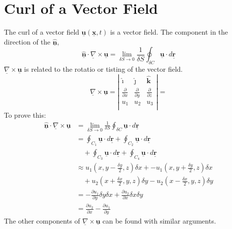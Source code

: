 \documentclass{article}
\renewcommand{\vec}[1]{\underline{\textbf{#1}}}
\newcommand{\veci}{\bm{\hat{\imath}}}
\newcommand{\vecj}{\bm{\hat{\jmath}}}
\newcommand{\veck}{\bm{\hat{k}}}
\newcommand{\vecn}{\underline{\mathbf{\hat{n}}}}
\newcommand{\de}{\delta}
\newcommand{\nab}{\underline{\nabla}}
\newcommand{\pd}[2]{\frac{\partial #1}{\partial #2}}
\newcommand{\curl}{\nab \times}
\begin{document}
\section{Curl of a Vector Field}
The curl of a vector field $\vec u (\vec x, t)$ is a vector field. The component in the direction of the $\vecn$,
$$ \vecn \cdot \curl \vec u = \lim_{\de S\to 0}{\frac{1}{\de S}\oint_{\de C}{\vec u \cdot d\vec r}} $$
$\curl \vec u$ is related to the rotatio or tisting of the vector field.
$$ \curl \vec u = \left |\begin{matrix}
  \veci & \vecj & \veck \\
  \pd{}{x} & \pd{}{y} & \pd{}{z} \\
  u_1 & u_2 & u_3 \\
\end{matrix}\right | = $$
To prove this:
\begin{align*}
  \vecn \cdot \curl \vec u &= \lim_{\de S\to 0}{\frac{1}{\de S}\oint_{\de C}{\vec u \cdot d\vec r}}\\
  &= \oint_{C_1}{\vec u \cdot d\vec r} + \oint_{C_2}{\vec u \cdot d\vec r} \\
  &\quad+ \oint_{C_3}{\vec u \cdot d\vec r} + \oint_{C_4}{\vec u \cdot d\vec r}\\
  &\approx u_1(x, y - \frac{\de y}{2}, z)\de x + - u_1(x, y + \frac{\de y}{2}, z)\de x\\
  &\quad+ u_2(x + \frac{\de x}{2}, y, z)\de y - u_2(x - \frac{\de x}{2}, y, z)\de y \\
  &= -\pd{u_1}{y}\de y\de x + \pd{u_2}{x}\de x\de y \\
  &= \pd{u_2}{x} - \pd{u_1}{y}
\end{align*}
The other components of $\curl \vec u$ can be found with similar arguments. 
\end{document}
